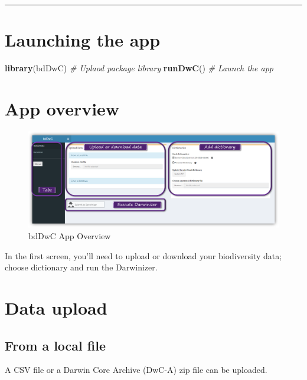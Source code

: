\documentclass[]{book}
\newenvironment{Shaded}{\begin{snugshade}}{\end{snugshade}}
\newcommand{\KeywordTok}[1]{\textcolor[rgb]{0.13,0.29,0.53}{\textbf{#1}}}
\newcommand{\CommentTok}[1]{\textcolor[rgb]{0.56,0.35,0.01}{\textit{#1}}}
\newcommand{\NormalTok}[1]{#1}
\theoremstyle{definition}
\theoremstyle{definition}
\theoremstyle{definition}
\theoremstyle{remark}
\begin{document}
\begin{center}\rule{0.5\linewidth}{\linethickness}\end{center}

\section{Launching the app}\label{launching-the-app}

\begin{Shaded}
\begin{Highlighting}[]
\KeywordTok{library}\NormalTok{(bdDwC) }\CommentTok{# Uplaod package library}
\KeywordTok{runDwC}\NormalTok{() }\CommentTok{# Launch the app}
\end{Highlighting}
\end{Shaded}

\section{App overview}\label{app-overview}

\begin{figure}
\centering
\includegraphics{img/bdDwC_Getting_started.png}
\caption{bdDwC App Overview}
\end{figure}

In the first screen, you'll need to upload or download your biodiversity
data; choose dictionary and run the Darwinizer.

\section{Data upload}\label{data-upload}

\subsection{From a local file}\label{from-a-local-file}

A CSV file or a Darwin Core Archive (DwC-A) zip file can be uploaded.
\end{document}
